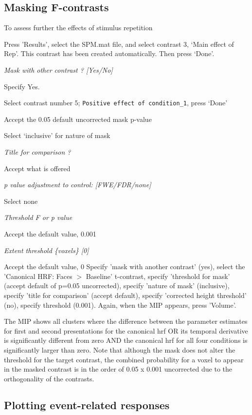 \subsection{Masking F-contrasts}

To assess further the effects of stimulus repetition
\bi
\item{Press 'Results', select the SPM.mat file, and 
select contrast 3, `Main effect of Rep'. This contrast has been created automatically. Then press `Done'.}
\item{\em Mask with other contrast ? [Yes/No]}
\item{Specify Yes.}
\item{Select contrast number 5; \verb!Positive effect of condition_1!, press `Done'}
\item{Accept the 0.05 default uncorrected mask p-value}
\item{Select `inclusive' for nature of mask}
\item{\em Title for comparison ?}
\item{Accept what is offered}
\item{\em p value adjustment to control: [FWE/FDR/none]}
\item{Select none}
\item{\em Threshold F or p value}
\item{Accept the default value, 0.001}
\item{\em Extent threshold \{voxels\} [0]}
\item{Accept the default value, 0}
\ei
Specify 'mask with another contrast' (yes), select the 'Canonical HRF: Faces $>$ Baseline' t-contrast, specify 'threshold for mask' (accept default of p=0.05 uncorrected), specify 'nature of mask' (inclusive), specify 'title for comparison' (accept default), specify 'corrected height threshold' (no), specify threshold (0.001). 
Again, when the MIP appears, press 'Volume'.

The MIP shows all clusters where the difference between the parameter estimates for first and second presentations for the canonical hrf OR its temporal derivative is significantly different from zero AND the canonical hrf for all four conditions is significantly larger than zero. Note that although the mask does not alter the threshold for the target contrast, the combined probability for a voxel to appear in the masked contrast is in the order of 0.05 x 0.001 uncorrected due to the orthogonality of the contrasts. 

\subsection{Plotting event-related responses}

